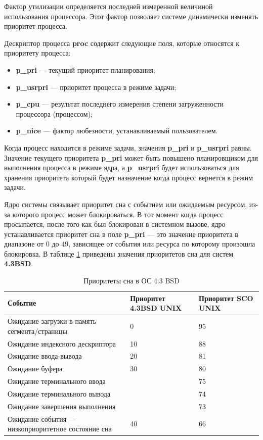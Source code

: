 \documentclass[a4paper,14pt]{extarticle}
\begin{document}
Фактор утилизации определяется последней измеренной величиной использования процессора. Этот фактор позволяет системе динамически изменять приоритет процесса.

Дескриптор процесса \textbf{proc} содержит следующие поля, которые относятся к приоритету процесса:

\begin{itemize}
    \item \textbf{p\_pri} --- текущий приоритет планирования;
    \item \textbf{p\_usrpri} --- приоритет процесса в режиме задачи;
    \item \textbf{p\_cpu} --- результат последнего измерения степени загруженности процессора (процессом);
    \item \textbf{p\_nice} --- фактор любезности, устанавливаемый пользователем.
\end{itemize}

Когда процесс находится в режиме задачи, значения \textbf{p\_pri} и \textbf{p\_usrpri} равны. Значение текущего приоритета \textbf{p\_pri} 
может быть повышено планировщиком для выполнения процесса в режиме ядра, а \textbf{p\_usrpri} будет использоваться для хранения приоритета 
который будет назначение когда процесс вернется в режим задачи.

Ядро системы связывает приоритет сна с событием или ожидаемым ресурсом, из-за которого процесс может блокироваться. В тот момент когда 
процесс просыпается, после того как был блокирован в системном вызове, ядро устанавливается приоритет сна в поле \textbf{p\_pri} --- это 
значение приоритета в диапазоне от 0 до 49, зависящее от события или ресурса по которому произошла блокировка. В таблице \ref{tab:bsd} 
приведены значения приоритетов сна для систем \textbf{4.3BSD}.

\begin{longtable}[Hc]{|p{8.5cm}|p{3.6cm}|p{3.6cm}|}
	\caption{Приоритеты сна в ОС 4.3 BSD\label{tab:bsd}}\\
	\hline
	\textbf{Событие} & \textbf{Приоритет 4.3BSD UNIX} & \textbf{Приоритет SCO UNIX} \\
	\hline
	Ожидание загрузки в память сегмента/страницы & 0 & 95 \\
	\hline
	Ожидание индексного дескриптора & 10 & 88 \\
	\hline
	Ожидание ввода-вывода & 20 & 81 \\
	\hline
	Ожидание буфера & 30 & 80 \\
	\hline
	Ожидание терминального ввода  &  & 75 \\
	\hline
	Ожидание терминального вывода &  & 74 \\
	\hline
	Ожидание завершения выполнения &  & 73 \\
	\hline
	Ожидание события --- низкоприоритетное состояние сна & 40 & 66 \\
	\hline
\end{longtable}
\end{document}
